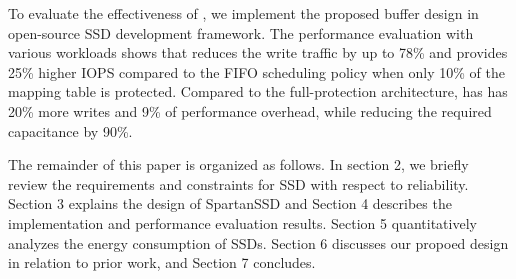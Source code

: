 To evaluate the effectiveness of \ours, we implement the proposed buffer design
in open-source SSD development framework. The performance evaluation with various workloads 
shows that \ours{} reduces the write traffic by up to 78\% and provides 25\% higher IOPS 
compared to the FIFO scheduling policy when only 10\% of the mapping table is protected. 
Compared to the full-protection architecture, \ours{} has has 20\% more writes and 
9\% of performance overhead, while reducing the required capacitance by 90\%. 

The remainder of this paper is organized as follows. In section 2, we briefly review the 
requirements and constraints for SSD with respect to reliability. Section 3 explains the 
design of SpartanSSD and Section 4 describes the implementation and performance evaluation results. 
Section 5 quantitatively analyzes the energy consumption of SSDs. Section 6 discusses our propoed design 
in relation to prior work, and Section 7 concludes. 

